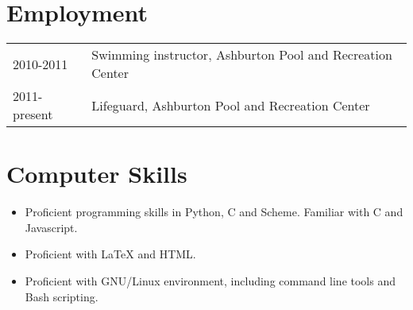 \documentclass[12pt,a4paper]{article}
\newcommand{\CPP}
{C\nolinebreak[4]\hspace{-.05em}\raisebox{.22ex}{\footnotesize\bf ++ }}
\newenvironment{labelledlist}
	{\renewcommand{\arraystretch}{1.5}\begin{tabular}{p{3cm} p{12cm}}}
	{\end{tabular}}
\begin{document}
\section*{Employment}
\begin{labelledlist}
	2010-2011 & Swimming instructor, Ashburton Pool and Recreation Center \\
	2011-present & Lifeguard, Ashburton Pool and Recreation Center \\
\end{labelledlist}

\section*{Computer Skills}
\begin{itemize}
	\item Proficient programming skills in Python, C and Scheme. Familiar with {\CPP} and Javascript.
	\item Proficient with {\LaTeX} and HTML.
	\item Proficient with GNU/Linux environment, including command line tools and Bash scripting.
\end{itemize}

\hfill \qedsymbol
\end{document}

